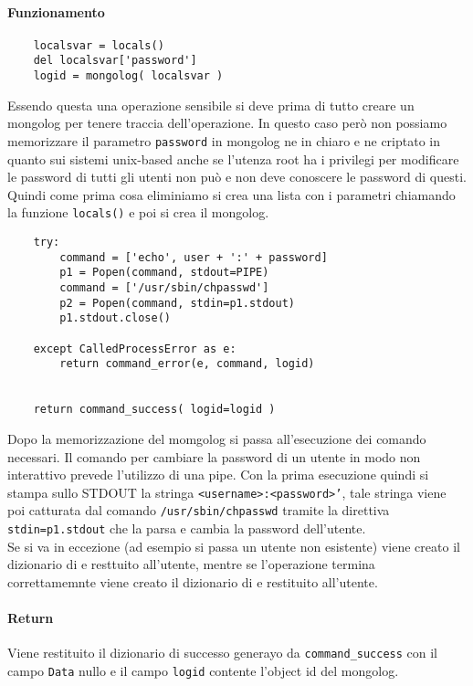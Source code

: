 \documentclass[11pt]{article}
\begin{document}
\paragraph{Funzionamento}
\begin{lstlisting}
    localsvar = locals()
    del localsvar['password']
    logid = mongolog( localsvar )
\end{lstlisting}
Essendo questa una operazione sensibile si deve prima di tutto creare un mongolog per tenere traccia dell'operazione.
In questo caso però non possiamo memorizzare il parametro \texttt{password} in mongolog ne in chiaro e ne criptato
in quanto sui sistemi unix-based anche se l'utenza root ha i privilegi per modificare le password di tutti gli utenti
non può e non deve conoscere le password di questi. Quindi come prima cosa eliminiamo si crea una lista
con i parametri chiamando la funzione \texttt{locals()} e poi si crea il mongolog.
\begin{lstlisting}
    try:
        command = ['echo', user + ':' + password]
        p1 = Popen(command, stdout=PIPE)
        command = ['/usr/sbin/chpasswd']
        p2 = Popen(command, stdin=p1.stdout)
        p1.stdout.close()
    
    except CalledProcessError as e:
        return command_error(e, command, logid)


    return command_success( logid=logid )
\end{lstlisting}
Dopo la memorizzazione del momgolog si passa all'esecuzione dei comando necessari. Il comando per cambiare
la password di un utente in modo non interattivo prevede l'utilizzo di una pipe. Con la prima esecuzione
quindi si stampa sullo STDOUT la stringa \texttt{<username>:<password>'}, tale stringa viene poi catturata dal
comando \texttt{/usr/sbin/chpasswd} tramite la direttiva \texttt{stdin=p1.stdout} che la parsa e cambia
la password dell'utente.\\
Se si va in eccezione (ad esempio si passa un utente non esistente) viene creato il dizionario di 
 e resttuito all'utente, mentre se l'operazione termina correttamemnte
viene creato il dizionario di  e restituito all'utente.
\paragraph{Return}
Viene restituito il dizionario di successo generayo da \texttt{command\_success} con il campo \texttt{Data} nullo
e il campo \texttt{logid} contente l'object id del mongolog.
\end{document}
